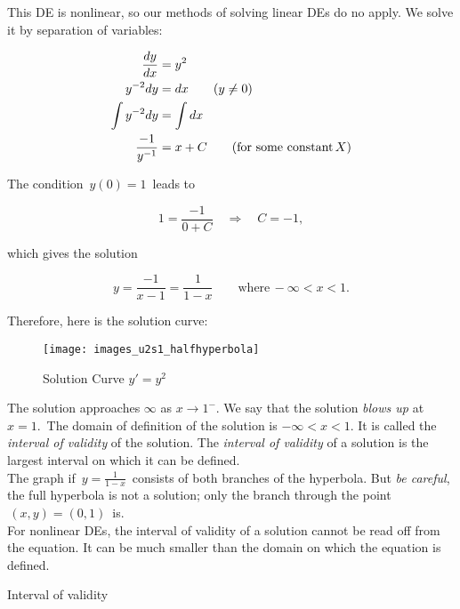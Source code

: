\Solution This DE is nonlinear, so our methods of solving linear DEs do no apply.
We solve it by separation of variables:

\begin{align*}
  \frac{dy}{dx} &= y^2 \\
  y^{-2} dy &= dx \qquad (y \neq 0) \\
  \int y^{-2} dy &= \int dx \\
  \frac{-1}{y^{-1}} &= x + C \qquad (\text{for some constant\,} X)
\end{align*}

The condition $\, y(0) = 1\,$ leads to

\begin{equation*}
  1 = \frac{-1}{0 + C} \quad \Longrightarrow \quad C = -1, 
\end{equation*}

which gives the solution

\begin{equation*}
  y = \frac{-1}{x -1} = \frac{1}{1 - x} \qquad \text{where} \, -\infty <x<1.
\end{equation*}

\clearpage

Therefore, here is the solution curve:

\begin{figure}[ht!]
  \centering
  \texttt{[image: images\_u2s1\_halfhyperbola]}
  \caption{Solution Curve $y' = y^2$}
\end{figure}

The solution approaches $\infty$ as $x\rightarrow 1^-$.
We say that the solution \emph{\color{blue} blows up} at $x=1.\,$
The domain of definition of the solution is $-\infty <x<1$.
It is called the \emph{\color{blue} interval of validity} of the solution.
The \emph{\color{blue} interval of validity} of a solution is the largest interval
on which it can be defined. \\

The graph if $\, y = \frac{1}{1-x}\,$ consists of both branches of the hyperbola.
But \emph{\color{orange} be careful}, the full hyperbola is not a solution;
only the branch through the point $\, (x,y)=(0,1)\,$ is. \\

For nonlinear DEs, the interval of validity of a solution cannot be read off from the equation.
It can be much smaller than the domain on which the equation is defined.\\

\begin{exercise}
  Interval of validity
\end{exercise}

